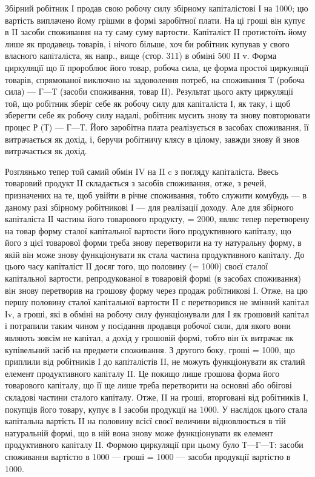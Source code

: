 Збірний робітник І продав свою робочу силу збірному капіталістові
І на 1000; цю вартість виплачено йому грішми в формі заробітної плати.
На ці гроші він купує в II засоби споживання на ту саму суму
вартости. Капіталіст II протистоїть йому лише як продавець товарів, і
нічого більше, хоч би робітник купував у свого власного капіталіста, як
напр., вище (стор. 311) в обміні 500 II v. Форма циркуляції що її пророблює
його товар, робоча сила, це форма простої циркуляції товарів, спрямованої
виключно на задоволення потреб, на споживання Т (робоча сила) —
$Г — Т$ (засоби споживання, товар II). Результат цього акту циркуляції
той, що робітник зберіг себе як робочу силу для капіталіста І, як таку,
і щоб зберегти себе як робочу силу надалі, робітник мусить знову та
знову повторювати процес Р (Т) — $Г — Т$. Його заробітна плата реалізується
в засобах споживання, її витрачається як дохід, і, беручи
робітничу клясу в цілому, завжди знову й знов витрачається як дохід.

Розгляньмо тепер той самий обмін IV на II c з погляду капіталіста. Ввесь
товаровий продукт II складається з засобів споживання, отже, з речей,
призначених на те, щоб увійти в річне споживання, тобто служити комубудь
— в даному разі збірному робітникові І — для реалізації доходу. Але
для збірного капіталіста ІI частина його товарового продукту, = 2000,
являє тепер перетворену на товар форму сталої капітальної вартости
його продуктивного капіталу, що його з цієї товарової форми треба
знову перетворити на ту натуральну форму, в якій він може знову
функціонувати як стала частина продуктивного капіталу. До цього часу
капіталіст II досяг того, що половину (= 1000) своєї сталої капітальної
вартости, репродукованої в товаровій формі (в засобах споживання) він
знову перетворив на грошову форму через продаж робітникові І. Отже,
на цю першу половину сталої капітальної вартости II с перетворився не
змінний капітал Іv, а гроші, які в обміні на робочу силу функціонували
для І як грошовий капітал і потрапили таким чином у посідання продавця
робочої сили, для якого вони являють зовсім не капітал, а дохід
у грошовій формі, тобто він їх витрачає як купівельний засіб на предмети
споживання. З другого боку, гроші = 1000, що приплили від робітників
І до капіталістів II, не можуть функціонувати як сталий елемент
продуктивного капіталу II. Це покищо лише грошова форма його товарового
капіталу, що її ще лише треба перетворити на основні або обігові
складові частини сталого капіталу. Отже, II на гроші, вторговані від
робітників І, покупців його товару, купує в І засоби продукції на 1000.
У наслідок цього стала капітальна вартість II на половину всієї своєї
величини відновлюється в тій натуральній формі, що в ній вона знову
може функціонувати як елемент продуктивного капіталу II. Формою
циркуляції при цьому було $Т — Г — Т$: засоби споживання вартістю в 1000 —
гроші = 1000 — засоби продукції вартістю в 1000.

